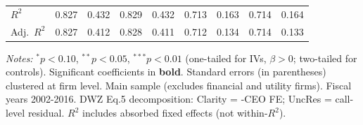 \documentclass[11pt,a4paper]{article}
\begin{document}
\begin{table}[htbp]
\begin{tabular}{lcccccccc}
$R^2$ & 0.827 & 0.432 & 0.829 & 0.432 & 0.713 & 0.163 & 0.714 & 0.164 \\
Adj.~$R^2$ & 0.827 & 0.412 & 0.828 & 0.411 & 0.712 & 0.134 & 0.714 & 0.133 \\
\bottomrule
\end{tabular}
\begin{minipage}{\linewidth}
\vspace{2pt}\scriptsize
\textit{Notes:} $^{*}p<0.10$, $^{**}p<0.05$, $^{***}p<0.01$ (one-tailed for IVs, $\beta > 0$; two-tailed for controls).
 Significant coefficients in \textbf{bold}.
 Standard errors (in parentheses) clustered at firm level.
 Main sample (excludes financial and utility firms). Fiscal years 2002-2016. DWZ Eq.5 decomposition: Clarity = -CEO FE; UncRes = call-level residual.
 $R^2$ includes absorbed fixed effects (not within-$R^2$).
\end{minipage}
\end{table}
\clearpage
\end{document}

